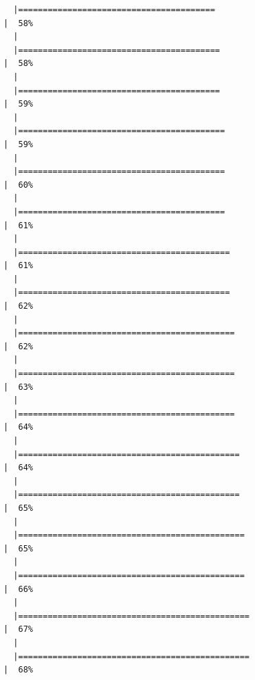 \documentclass[
  letterpaper,
  DIV=11,
  numbers=noendperiod]{scrreprt}
\begin{document}
\begin{verbatim}
  |========================================                              |  58%
  |                                                                            
  |=========================================                             |  58%
  |                                                                            
  |=========================================                             |  59%
  |                                                                            
  |==========================================                            |  59%
  |                                                                            
  |==========================================                            |  60%
  |                                                                            
  |==========================================                            |  61%
  |                                                                            
  |===========================================                           |  61%
  |                                                                            
  |===========================================                           |  62%
  |                                                                            
  |============================================                          |  62%
  |                                                                            
  |============================================                          |  63%
  |                                                                            
  |============================================                          |  64%
  |                                                                            
  |=============================================                         |  64%
  |                                                                            
  |=============================================                         |  65%
  |                                                                            
  |==============================================                        |  65%
  |                                                                            
  |==============================================                        |  66%
  |                                                                            
  |===============================================                       |  67%
  |                                                                            
  |===============================================                       |  68%

\end{verbatim}
\end{document}
